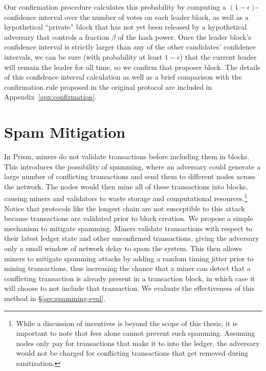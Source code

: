 Our confirmation procedure calculates this probability by computing a $(1-\epsilon)$-confidence interval over the number of votes on each leader block, as well as a hypothetical ``private'' block that has not yet been released by a hypothetical adversary that controls a fraction $\beta$ of the hash power. 
Once the leader block's confidence interval is strictly larger than any of the other candidates' confidence intervals, we can be sure (with probability at least $1-\epsilon$) that the current leader will remain the leader for all time, so we confirm that proposer block. 
The details of this confidence interval calculation as well as a brief comparison with the confirmation rule proposed in the original protocol \cite{prism-theory} are included in Appendix~\ref{apx:confirmation}.

\section{Spam Mitigation}
\label{sec:spamming-design}

In Prism, miners do not validate transactions before including them in blocks.
This introduces the possibility of spamming, where an adversary could generate a large number of conflicting transactions and send them to different nodes across the network.  
The nodes would then mine all of these transactions into blocks, causing miners and validators to waste storage  and computational  resources.\footnote{While a discussion of incentives is beyond the scope of this thesis, it is important to note that fees alone cannot prevent such spamming. Assuming nodes only pay for transactions that make it to into the ledger, the adversary would not be charged for conflicting transactions that get removed during sanitization.}
Notice that protocols like the longest chain are not susceptible to this attack because transactions are validated prior to block creation. 
We propose a simple mechanism to mitigate spamming. Miners validate transactions with respect to their latest ledger state and other unconfirmed transactions, giving the adversary only a small window of network delay to spam the system. 
This then allows miners to mitigate spamming attacks by adding a random timing jitter prior to mining transactions, thus increasing the chance that a miner can detect that a conflicting transaction is already present in a transaction block, in  which case it will choose to not include that transaction.
We evaluate the effectiveness of this method in \S\ref{sec:spamming-eval}.

